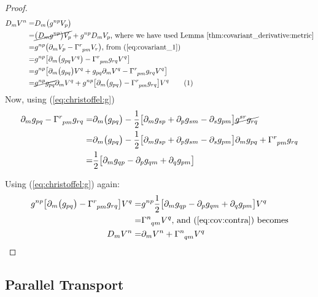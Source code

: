 \documentclass[]{article}
\newcommand\numberthis{\addtocounter{equation}{1}\tag{\theequation}}
\begin{document}
{\begin{proof}
	\begin{align*}
		D_m V^n =& D_m\big( g^{np} V_p\big)\\
		=&  \cancel{\big(D_m g^{np}\big) V_p} +  g^{np} D_m V_p \text{,  where we have used Lemma \ref{thm:covariant_derivative:metric}}\\
		=& g^{np} \big(\partial_m V_p -  \Gamma\indices{^r_{pm}} V_r\big) \text{, from (\ref{eq:covariant_1})}\\
		=& g^{np} \big[\partial_m \big(g_{pq} V^q\big) -  \Gamma\indices{^r_{pm}} g_{rq} V^q\big]\\
		=& g^{np} \big[ \partial_m \big(g_{pq} \big)V^q + g_{pq} \partial_m V^q -  \Gamma\indices{^r_{pm}} g_{rq} V^q\big]\\
		=& \cancel{g^{np} g_{pq}} \partial_m V^q +  g^{np} \big[ \partial_m \big(g_{pq} \big) -   \Gamma\indices{^r_{pm}} g_{rq} \big] V^q \numberthis\label{eq:cov:contra}
	\end{align*}
	Now, using (\ref{eq:christoffel:g})
	\begin{align*}
		 \partial_m g_{pq} -   \Gamma\indices{^r_{pm}} g_{rq} =&\partial_m \big(g_{pq} \big) - \frac{1}{2}\big[\partial_m g_{sp} + \partial_p g_{sm}- \partial_s g_{pm}\big]  \cancel{g^{sr} g_{rq}}\\
		=& \partial_m \big(g_{pq} \big) - \frac{1}{2}\big[\partial_m g_{sp} + \partial_p g_{sm}- \partial_s g_{pm}\big] \partial_m g_{pq} +   \Gamma\indices{^r_{pm}} g_{rq}\\
		 =& \frac{1}{2}\big[\partial_m g_{qp} - \partial_p g_{qm}+ \partial_q g_{pm}\big] 
	\end{align*}
	
	Using (\ref{eq:christoffel:g}) again:
	\begin{align*}
		g^{np} \big[ \partial_m \big(g_{pq} \big) -   \Gamma\indices{^r_{pm}} g_{rq} \big] V^q =& g^{np} \frac{1}{2}\big[\partial_m g_{qp} - \partial_p g_{qm}+ \partial_q g_{pm}\big] V^q\\
		=& \Gamma \indices{^n_{qm}} V^q \text{, and (\ref{eq:cov:contra}) becomes}\\
		D_m V^n =& \partial_m V^n +  \Gamma \indices{^n_{qm}} V^q
	\end{align*}
	
\end{proof}

\subsection{Parallel Transport}

}
\end{document}
